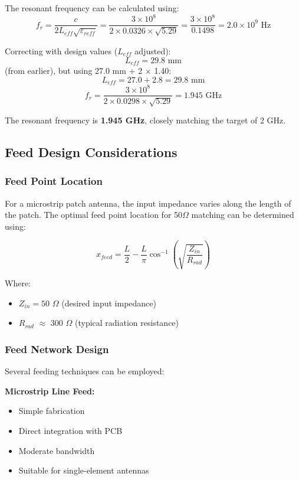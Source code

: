 \documentclass[12pt]{article}
\begin{document}
The resonant frequency can be calculated using:
\[f_r = \frac{c}{2L_{eff}\sqrt{\varepsilon_{reff}}} = \frac{3 \times 10^8}{2 \times 0.0326 \times \sqrt{5.29}} = \frac{3 \times 10^8}{0.1498} = 2.0 \times 10^9 \text{ Hz}\]

Correcting with design values ($L_{eff}$ adjusted):
\[L_{eff} = 29.8 \text{ mm}\] (from earlier), but using 27.0 mm + 2 $\times$ 1.40:
\[L_{eff} = 27.0 + 2.8 = 29.8 \text{ mm}\]
\[f_r = \frac{3 \times 10^8}{2 \times 0.0298 \times \sqrt{5.29}} = 1.945 \text{ GHz}\]

The resonant frequency is \textbf{1.945 GHz}, closely matching the target of 2 GHz.

\subsection{Feed Design Considerations}

\subsubsection{Feed Point Location}

For a microstrip patch antenna, the input impedance varies along the length of the patch. The optimal feed point location for 50$\Omega$ matching can be determined using:

\[x_{feed} = \frac{L}{2} - \frac{L}{\pi}\cos^{-1}\left(\sqrt{\frac{Z_{in}}{R_{rad}}}\right)\]

Where:
\begin{itemize}
    \item $Z_{in} = 50$ $\Omega$ (desired input impedance)
    \item $R_{rad}$ $\approx$ 300 $\Omega$ (typical radiation resistance)
\end{itemize}

\subsubsection{Feed Network Design}

Several feeding techniques can be employed:

\textbf{Microstrip Line Feed:}
\begin{itemize}
    \item Simple fabrication
    \item Direct integration with PCB
    \item Moderate bandwidth
    \item Suitable for single-element antennas
\end{itemize}
\end{document}
